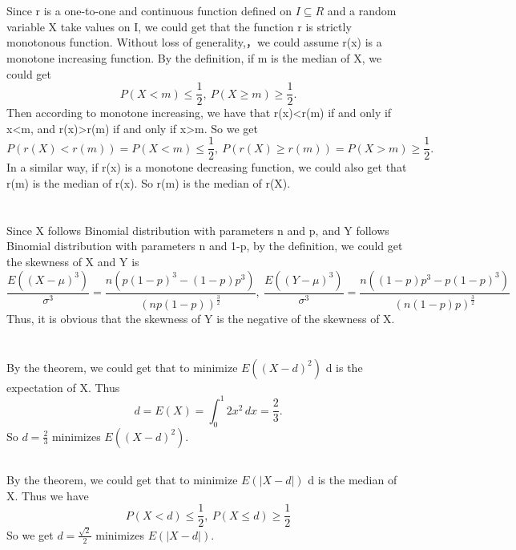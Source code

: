 \documentclass[10.5pt]{article}
\begin{document}
\section{}
Since r is a one-to-one and continuous function defined on $I\subseteq R$ and a random variable X take values on I, we could get that the function r is strictly monotonous function. Without loss of generality,，we could assume r(x) is a monotone increasing function. By the definition, if m is the median of X, we could get $$P(X<m)\leqslant\frac{1}{2},~P(X\geqslant m)\geqslant\frac{1}{2}.$$\indent
Then according to monotone increasing, we have that r(x)<r(m) if and only if x<m, and r(x)>r(m) if and only if x>m. So we get $$P(r(X)<r(m))=P(X<m)\leqslant\frac{1}{2},~P(r(X)\geqslant r(m))=P(X>m)\geqslant \frac{1}{2}.$$\indent In a similar way, if r(x) is a monotone decreasing function, we could also get that r(m) is the median of r(x). So r(m) is the median of r(X).

\section{}
Since X follows Binomial distribution with parameters n and p, and Y follows Binomial distribution with parameters n and 1-p, by the definition, we could get the skewness of X and Y is $$\frac{E((X-\mu)^3)}{\sigma^3} = \frac{n\left(p(1-p)^3-(1-p)p^3\right)}{\left(np(1-p)\right)^{\frac{3}{2}}},~\frac{E((Y-\mu)^3)}{\sigma^3} = \frac{n\left((1-p)p^3-p(1-p)^3\right)}{\left(n(1-p)p\right)^{\frac{3}{2}}}$$\indent
Thus, it is obvious that the skewness of Y is the negative of the skewness of X.

\section{}
\subsection{}
By the theorem, we could get that to minimize $E((X-d)^2)$ d is the expectation of X. Thus $$d = E(X) = \int_0^1 2x^2 \,dx = \frac{2}{3}.$$\indent
So $d=\frac{2}{3}$ minimizes $E((X-d)^2)$.
\subsection{}
By the theorem, we could get that to minimize $E(\left\lvert X-d\right\rvert)$ d is the median of X. Thus we have $$P(X<d)\leqslant\frac{1}{2},~P(X\leqslant d)\geqslant\frac{1}{2}$$\indent
So we get $d=\frac{\sqrt{2}}{2}$ minimizes $E(\left\lvert X-d\right\rvert)$.
\end{document}
